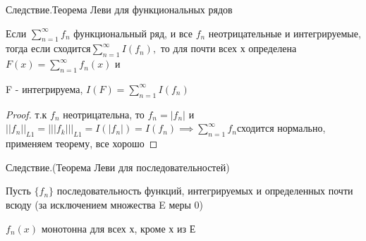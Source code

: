 \documentclass[a4paper, 12pt]{article}
\theoremstyle{definition}
\theoremstyle{remark}
\begin{document}
Следствие.{Теорема Леви для функциональных рядов}

Если $\sum_{n = 1}^{\infty} f_n$ функциональный ряд, и все $f_n$ неотрицательные и интегрируемые, тогда если 
сходится$\sum_{n = 1}^{\infty} I(f_n),$ то для почти всех х определена $F(x) = \sum_{n = 1}^{\infty} f_n(x)$ и

F -  интегрируема, $I(F) = \sum_{n = 1}^{\infty} I(f_n)$

\begin{proof}
     т.к $f_n$ неотрицательна, то $f_n  = |f_n|$ и $||f_n||_{L1} = |||f_k|||_{L1} = I(|f_n|) = I(f_n) \implies \sum_{n = 1}^{\infty} f_n $сходится нормально, применяем 
     теорему, все хорошо 
\end{proof}
Следствие.(Теорема Леви для последовательностей)

Пусть $\{f_n\}$ последовательность функций, интегрируемых и определенных почти всюду (за исключением множества E меры 0)

$f_n(x)$ монотонна для всех х, кроме х из Е
\end{document}
